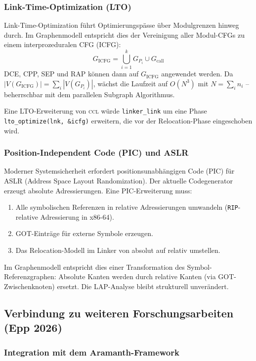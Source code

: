 ﻿\documentclass[a4paper,12pt]{article}
\theoremstyle{definition}
\begin{document}
\subsubsection{Link-Time-Optimization (LTO)}

Link-Time-Optimization führt Optimierungspässe über Modulgrenzen hinweg
durch. Im Graphenmodell entspricht dies der Vereinigung aller
Modul-CFGs zu einem interprozeduralen CFG (ICFG):
\[
G_{\mathrm{ICFG}} = \bigcup_{i=1}^{k} G_{P_i} \cup G_{\mathrm{call}}
\]
DCE, CPP, SEP und RAP können dann auf $G_{\mathrm{ICFG}}$ angewendet
werden. Da $|V(G_{\mathrm{ICFG}})| = \sum_i |V(G_{P_i})|$, wächst die
Laufzeit auf $O(N^3)$ mit $N = \sum_i n_i$ -- beherrschbar mit dem
parallelen Subgraph Algorithmus.

Eine LTO-Erweiterung von \textsc{ccl} würde
\texttt{linker\_link} um eine Phase
\texttt{lto\_optimize(lnk, \&icfg)} erweitern, die vor der
Relocation-Phase eingeschoben wird.

\subsubsection{Position-Independent Code (PIC) und ASLR}

Moderner Systemsicherheit erfordert positionsunabhängigen Code (PIC)
für ASLR (Address Space Layout Randomization). Der aktuelle Codegenerator
erzeugt absolute Adressierungen. Eine PIC-Erweiterung muss:
\begin{enumerate}
	\item Alle symbolischen Referenzen in relative Adressierungen
	umwandeln (\texttt{RIP}-relative Adressierung in x86-64).
	\item GOT-Einträge für externe Symbole erzeugen.
	\item Das Relocation-Modell im Linker von absolut auf relativ
	umstellen.
\end{enumerate}
Im Graphenmodell entspricht dies einer Transformation des
Symbol-Referenzgraphen: Absolute Kanten werden durch relative Kanten
(via GOT-Zwischenknoten) ersetzt. Die LAP-Analyse bleibt strukturell
unverändert.

\subsection{Verbindung zu weiteren Forschungsarbeiten (Epp 2026)}
\label{sec:ausblick-epp}

\subsubsection{Integration mit dem Aramanth-Framework}
\end{document}
